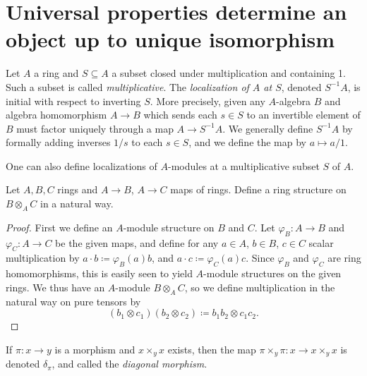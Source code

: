 \section{Universal properties determine an object up to unique isomorphism}

\begin{example}
	Let $A$ a ring and $S\subseteq A$ a subset closed under multiplication and containing 1. Such a subset is called \emph{multiplicative}. The \emph{localization of $A$ at $S$}, denoted $S^{-1} A$, is initial with respect to inverting $S$. More precisely, given any $A$-algebra $B$ and algebra homomorphism $A\to B$ which sends each $s\in S$ to an invertible element of $B$ must factor uniquely through a map $A\to S^{-1} A$. We generally define $S^{-1} A$ by formally adding inverses $1/s$ to each $s\in S$, and we define the map by $a\mapsto a/1$.
\end{example}
\begin{remark}
	One can also define localizations of $A$-modules at a multiplicative subset $S$ of $A$.
\end{remark}

\begin{exercise}\label{ex:1:2:3}
	Let $A,B,C$ rings and $A\to B$, $A\to C$ maps of rings. Define a ring structure on $B\otimes _AC$ in a natural way.
\end{exercise}
\begin{proof}
	First we define an $A$-module structure on $B$ and $C$. Let $\varphi _B : A \to B$ and $\varphi _C : A \to C$ be the given maps, and define for any $a\in A$, $b\in B$, $c\in C$ scalar multiplication by $a\cdot b\coloneqq \varphi_B(a)b$, and $a\cdot c\coloneqq \varphi_C(a)c$. Since $\varphi _B$ and $\varphi _C$ are ring homomorphisms, this is easily seen to yield $A$-module structures on the given rings. We thus have an $A$-module $B\otimes _AC$, so we define multiplication in the natural way on pure tensors by
	\[
		(b_1\otimes c_1)(b_2\otimes c_2)\coloneqq b_1b_2\otimes c_1c_2
	.\]
\end{proof}

\begin{definition}\label{dfn:1-2-4}
	If $\pi : x \to y$ is a morphism and $x\times _yx$ exists, then the map $\pi \times _y\pi : x \to x\times _yx$ is denoted $\delta _{\pi } $, and called the \emph{diagonal morphism}.
\end{definition}


